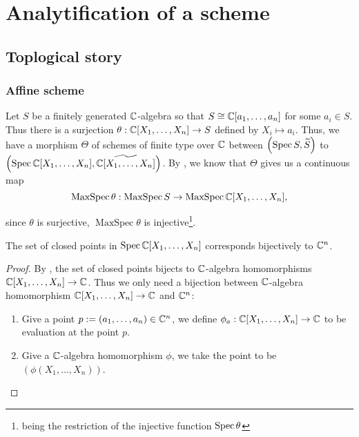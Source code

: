 \chapter{Analytification of a scheme}


\section{Toplogical story}


\subsection{Affine scheme}



Let $S$ be a finitely generated $\mathbb{C}$-algebra so that $S \cong \mathbb{C}[a_{1},\dots, a_{n}]$ for some $a_{i} \in S$. Thus there is a surjection $\theta: \mathbb{C}[X_{1}, \dots, X_{n}] \to S$ defined by $X_{i} \mapsto a_{i}$. Thus, we have a morphism $\Theta$ of schemes of finite type over $\mathbb{C}$ between $\left(\operatorname*{Spec}{S}, \widetilde{S}\right)$ to $\left(\operatorname*{Spec}{\mathbb{C}[X_{1},\dots, X_{n}]}, \widetilde{\mathbb{C}[X_{1},\dots, X_{n}]}\right)$. By , we know that $\Theta$ gives us a continuous map
\[
	\operatorname{MaxSpec}\theta: \operatorname{MaxSpec} S \to \operatorname{MaxSpec} \mathbb{C}[X_{1},\dots, X_{n}],
\]

since $\theta$ is surjective, $\operatorname{MaxSpec}\theta$ is injective\footnote{being the restriction of the injective function $\operatorname{Spec} \theta$}.

\begin{theorem}
	The set of closed points in $\operatorname{Spec}{\mathbb{C}[X_{1},\dots, X_{n}]}$ corresponds bijectively to $\mathbb{C}^{n}$.

\end{theorem}
\begin{proof}
	By , the set of closed points
	bijects to $\mathbb{C}$-algebra homomorphisms $\mathbb{C}[X_{1}, \dots, X_{n}] \to \mathbb{C}$. Thus we only need a bijection between $\mathbb{C}$-algebra homomorphism $\mathbb{C}[X_{1}, \dots, X_{n}] \to \mathbb{C}$ and $\mathbb{C}^{n}$:
	\begin{enumerate}
		\item Give a point $p := (a_{1},\dots, a_{n}) \in \mathbb{C}^{n}$, we define $\phi_{a}: \mathbb{C}[X_{1},\dots, X_{n}] \to \mathbb{C}$ to be evaluation at the point $p$.

		\item Give a $\mathbb{C}$-algebra homomorphism $\phi$, we take the point to be $(\phi(X_{1}, \dots, X_{n}))$.
	\end{enumerate}
\end{proof}

